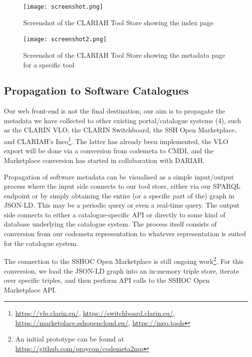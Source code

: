 \documentclass[a4paper,11pt]{article}
\begin{document}
\begin{figure}[h]
\begin{center}
\texttt{[image: screenshot.png]}
\caption{Screenshot of the CLARIAH Tool Store showing the index page}
\label{fig:toolstore1}
\end{center}
\end{figure}

\begin{figure}[h!]
\begin{center}
\texttt{[image: screenshot2.png]}
\caption{Screenshot of the CLARIAH Tool Store showing the metadata page for a specific tool}
\label{fig:toolstore2}
\end{center}
\end{figure}

\subsection{Propagation to Software Catalogues}

Our web front-end is not the final destination; our aim is to propagate the
metadata we have collected to other existing portal/catalogue systems (4), such as
the CLARIN VLO, the CLARIN Switchboard, the SSH Open Marketplace, and CLARIAH's
Ineo\footnote{\url{https://vlo.clarin.eu/},
\url{https://switchboard.clarin.eu/},
\url{https://marketplace.sshopencloud.eu/}, \url{https://ineo.tools}}. The
latter has already been implemented, the VLO export will be done via a conversion
from codemeta to CMDI, and the Marketplace conversion has started in collaboration with
DARIAH.

Propagation of software metadata can be visualised as a simple input/output
process where the input side connects to our tool store, either via our SPARQL
endpoint or by simply obtaining the entire (or a specific part of the) graph in
JSON-LD. This may be a periodic query or even a real-time query. The output
side connects to either a catalogue-specific API or directly to some kind of
database underlying the catalogue system. The process itself consists of
conversion from our codemeta representation to whatever representation is
suited for the catalogue system.

The connection to the SSHOC Open Marketplace is still ongoing work\footnote{An
initial prototype can be found at
\url{https://github.com/proycon/codemeta2mp}}. For this conversion, we load the
JSON-LD graph into an in-memory triple store, iterate over specific triples, and
then perform API calls to the SSHOC Open Marketplace API.
\end{document}
